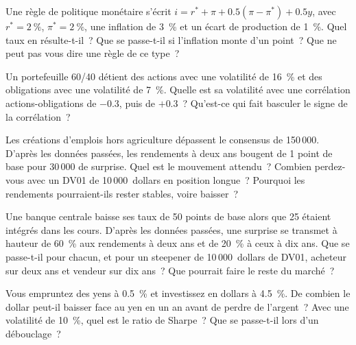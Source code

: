 \begin{question}\label{iq:iv2:macro-market-knowledge-and-pitches:10}
Une règle de politique monétaire s'écrit $i = r^* + \pi + 0.5(\pi - \pi^*) + 0.5y$, avec $r^* = 2~\%$, $\pi^* = 2~\%$, une inflation de 3~\% et un écart de production de 1~\%. Quel taux en résulte-t-il~? Que se passe-t-il si l'inflation monte d'un point~? Que ne peut pas vous dire une règle de ce type~?
\end{question}

\begin{question}\label{iq:iv2:macro-market-knowledge-and-pitches:11}
Un portefeuille 60/40 détient des actions avec une volatilité de 16~\% et des obligations avec une volatilité de 7~\%. Quelle est sa volatilité avec une corrélation actions-obligations de $-0.3$, puis de $+0.3$~? Qu'est-ce qui fait basculer le signe de la corrélation~?
\end{question}

\begin{question}\label{iq:iv2:macro-market-knowledge-and-pitches:12}
Les créations d'emplois hors agriculture dépassent le consensus de 150\,000. D'après les données passées, les rendements à deux ans bougent de 1 point de base pour 30\,000 de surprise. Quel est le mouvement attendu~? Combien perdez-vous avec un DV01 de 10\,000~dollars en position longue~? Pourquoi les rendements pourraient-ils rester stables, voire baisser~?
\end{question}

\begin{question}\label{iq:iv2:macro-market-knowledge-and-pitches:13}
Une banque centrale baisse ses taux de 50 points de base alors que 25 étaient intégrés dans les cours. D'après les données passées, une surprise se transmet à hauteur de 60~\% aux rendements à deux ans et de 20~\% à ceux à dix ans. Que se passe-t-il pour chacun, et pour un steepener de 10\,000~dollars de DV01, acheteur sur deux ans et vendeur sur dix ans~? Que pourrait faire le reste du marché~?
\end{question}

\begin{question}\label{iq:iv2:macro-market-knowledge-and-pitches:14}
Vous empruntez des yens à 0.5~\% et investissez en dollars à 4.5~\%. De combien le dollar peut-il baisser face au yen en un an avant de perdre de l'argent~? Avec une volatilité de 10~\%, quel est le ratio de Sharpe~? Que se passe-t-il lors d'un débouclage~?
\end{question}

